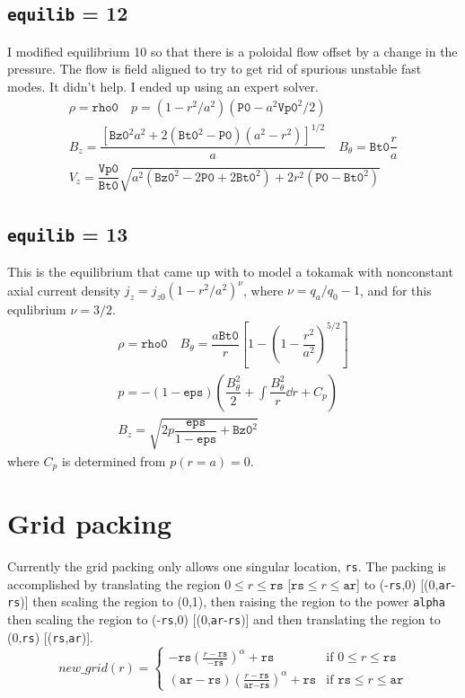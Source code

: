 \documentclass[letterpaper]{article}
\newcommand{\ttt}[1]{\texttt{#1}}
\begin{document}
\subsection{\ttt{equilib} = 12}
I modified equilibrium 10 so that there is a poloidal flow offset by a change in the pressure.  The flow is field aligned to try to get rid of spurious unstable fast modes.  It didn't help.  I ended up using an expert solver.
\begin{equation}
\begin{array}{c}
\rho=\texttt{rho0} 
\quad  p = (1-r^2/a^2)(\ttt{P0}-a^2 \ttt{Vp0}^2/2)\\
B_z = \dfrac{\left [ \texttt{Bz0}^2 a^2+2(\texttt{Bt0}^2-\texttt{P0})(a^2-r^2)\right ]^{1/2}}{a} 
\quad B_{\theta}=\texttt{Bt0}\dfrac{r}{a}\\
V_z=\dfrac{\ttt{Vp0}}{\ttt{Bt0}}\sqrt{a^2(\ttt{Bz0}^2-2\ttt{P0}+2 \ttt{Bt0}^2)+ 2r^2(\ttt{P0}-\ttt{Bt0}^2)}
\end{array}
\end{equation}
\subsection{\ttt{equilib} = 13}
This is the equilibrium that \citet{Wesson1978} came up with to model a tokamak with nonconstant axial current density $j_z=j_{z0}(1-r^2/a^2)^\nu$, where $\nu=q_a/q_0-1$, and for this equlibrium $\nu=3/2$.
\begin{equation}
\begin{array}{c}
\rho=\ttt{rho0}
\quad B_\theta=\dfrac{a\ttt{Bt0}}{r}\left[1-\left(1-\dfrac{r^2}{a^2}\right)^{5/2}\right]\\
p=-(1-\ttt{eps})\left(\dfrac{B_\theta^2}{2}+{\displaystyle\int \dfrac{B_\theta^2}{r}\dd r}+C_p\right)\\
B_z=\sqrt{2p\dfrac{\ttt{eps}}{1-\ttt{eps}}+\ttt{Bz0}^2}
\end{array}
\end{equation}
where $C_p$ is determined from $p(r=a)=0$.

\section{Grid packing}
Currently the grid packing only allows one singular location, \ttt{rs}.  The packing is accomplished  by translating the region $0\le r\le \ttt{rs}$ [$\ttt{rs} \le r \le \ttt{ar}$] to (-\ttt{rs},0) [(0,\ttt{ar}-\ttt{rs})] then scaling the region to (0,1), then raising the region to the power \ttt{alpha} then scaling the region to (-\ttt{rs},0) [(0,\ttt{ar}-\ttt{rs})] and then translating the region to (0,\ttt{rs}) [(\ttt{rs},\ttt{ar})].
\begin{equation}
new\_grid(r)=\left \{
\begin{array}{ll}
-\ttt{rs}\left (\frac{r-\ttt{rs}}{-\ttt{rs}}\right )^{\alpha} + \ttt{rs} & 
\textrm{if\ } 0\le r\le \ttt{rs} \\
\left (\ttt{ar}-\ttt{rs} \right) \left (\frac{r-\ttt{rs}}{\ttt{ar}-\ttt{rs}}\right )^{\alpha} + \ttt{rs}& 
\textrm{if\ } \ttt{rs} \le r \le \ttt{ar}
\end{array}
\right .
\end{equation}
\end{document}
